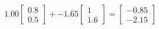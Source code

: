 \documentclass[preview]{standalone}
\begin{document}
\begin{align*}
1.00 \begin{bmatrix} 0.8 \\ 0.5 \end{bmatrix} + -1.65 \begin{bmatrix} 1 \\ 1.6 \end{bmatrix} = \begin{bmatrix} -0.85 \\ -2.15 \end{bmatrix}
\end{align*}
\end{document}
